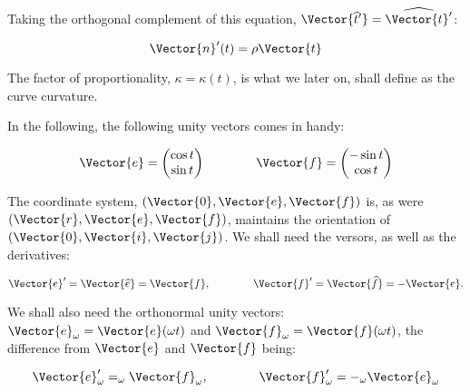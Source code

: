 Taking the orthogonal complement of this equation, $\Vector{\widehat{t}'}=\widehat{\Vector{t}'}$:

\[
 \Vector{n}'(t)
 =
 \rho \Vector{t}
\]

The factor of proportionality, $\kappa=\kappa(t)$, is what we later on, shall define as the curve curvature.

In the following, the following unity vectors comes in handy:

\[
 \Vector{e}
 =
 \begin{pmatrix}
   \cos{t}\\\sin{t}
 \end{pmatrix}
 \qquad \qquad
  \Vector{f}
 =
 \begin{pmatrix}
   -\sin{t}\\\cos{t}
 \end{pmatrix}
\]


The coordinate system, $(\Vector{0},\Vector{e},\Vector{f})$ is,
as were $(\Vector{r},\Vector{e},\Vector{f})$, maintains the orientation
of $(\Vector{0},\Vector{i},\Vector{j})$. We shall need the versors, as well as
the derivatives:

\[
 \Vector{e}'
 =
  \Vector{\widehat{e}}
 =
 \Vector{f},
 \qquad\qquad
 \Vector{f}'
 =
  \Vector{\widehat{f}}
 =
 -\Vector{e}.
\]

We shall also need the orthonormal unity vectors: 
$\Vector{e}_\omega=\Vector{e}(\omega t)$ and 
$\Vector{f}_\omega=\Vector{f}(\omega t)$, the difference
from $\Vector{e}$ and $\Vector{f}$ being:

\[
  \Vector{e}_\omega'
 =
 _\omega\Vector{f}_\omega,
 \qquad \qquad
 \Vector{f}_\omega'
 =
 -_\omega\Vector{e}_\omega
\]




 
 
